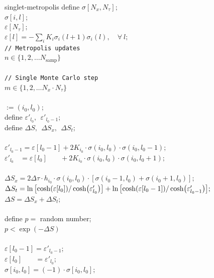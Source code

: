 \documentclass[../thesis_main.tex]{subfiles}
\begin{document}
\begin{algorithm}{singlet-metropolis}
    \> define $\sigma[N_x ,N_\tau];$ \\
    \>  $\sigma[i, l]$;\\
    \>  $\varepsilon[N_\tau];$ \\
    \>  $\varepsilon[l] = -\sum_i K_i \sigma_i(l+1) \sigma_i(l), \quad\forall\: l;$ \\
    \> \texttt{// Metropolis updates} \\
     $n \in \{1, 2, \ldots N_\text{samp}\}$ \\
    \\
    \>\> \texttt{// Single Monte Carlo step} \\
    \> $m \in \{1, 2, \ldots N_x \cdot N_\tau \}$ \\
    \>\\
    \>\>\> $:=(i_0, l_0)$;\\
    \>\>\> define $\varepsilon'_{l_0}, \:\:
    \varepsilon'_{l_0 - 1}; $\\
    \>\>\> define $\Delta S, \:\: \Delta S_x, \:\: \Delta S_t;$\\
    \\
    \>\>\> $\varepsilon'_{l_0-1} = \varepsilon[l_0-1] + 2K_{i_0}\cdot\sigma(i_0, l_0)\cdot\sigma(i_0, l_0-1);$\\
    \>\>\> $\varepsilon'_{l_0}\:\:\:\: = \varepsilon[l_0] \:\:\:\:\quad + 2K_{i_0}\cdot\sigma(i_0, l_0)\cdot\sigma(i_0, l_0+1);$\\
    \\
    \>\>\> $\Delta S_x = 2\Delta \tau \cdot h_{i_0} \cdot \sigma(i_0, l_0) \cdot [\sigma(i_0-1,l_0) + \sigma(i_0+1,l_0)];$ \\
    \>\>\> $\Delta S_t = \ln \qty[\cosh(\varepsilon[l_0])/\cosh(\varepsilon'_{l_0})] + \ln\qty[\cosh(\varepsilon[l_0-1])/\cosh(\varepsilon'_{l_0-1})] ;$ \\
    \>\>\> $\Delta S = \Delta S_x + \Delta S_t ;$ \\ 
    \\
    \>\>\> define $p = $ random number; \\
    \>\> $p < \exp(-\Delta S)$\\  
    \>\>\\
    \>\>\>\> $\varepsilon[l_0 - 1] = \varepsilon'_{l_0-1}$; \\
    \>\>\>\> $\varepsilon[l_0] \:\:\:\:\quad =  \varepsilon'_{l_0}$; \\
    \>\>\>\> $\sigma[i_0, l_0] = (-1)\cdot \sigma[i_0, l_0];$\\
    \>\>\\
    \>\\
    \\
\end{algorithm}
\end{document}
